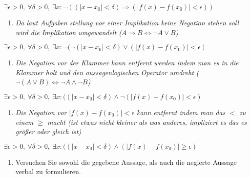 \begin{center}
$\exists \epsilon > 0, \ \forall \delta > 0, \ \exists x : \lnot ((| x - x_0 | < \delta) \Rightarrow (| f(x) - f(x_0)| < \epsilon))$
\end{center}

\begin{enumerate}[label={3.}, leftmargin=*]
\item \textit{Da laut Aufgaben stellung vor einer Implikation keine Negation stehen soll wird die Implikation umgewandelt ($A \Rightarrow B \Leftrightarrow \lnot A \lor B$)}
\end{enumerate}

\begin{center}
$\exists \epsilon > 0, \ \forall \delta > 0, \ \exists x : \lnot (\lnot (|x - x_0| < \delta) \lor (|f(x) - f(x_0)| < \epsilon)$
\end{center}

\begin{enumerate}[label={4.}, leftmargin=*]
\item \textit{Die Negation vor der Klammer kann entfernt werden indem man es in die Klammer holt und den aussagenlogischen Operator umdreht ($\lnot(A \lor B) \Leftrightarrow \lnot A \land \lnot B$)}
\end{enumerate}

\begin{center}
$\exists \epsilon > 0, \ \forall \delta > 0, \ \exists x : ((|x - x_0| < \delta) \land \lnot (|f(x) - f(x_0)| < \epsilon)$
\end{center}

\begin{enumerate}[label={4.}, leftmargin=*]
\item \textit{Die Negation vor $|f(x) - f(x_0)| < \epsilon$ kann entfernt indem man das $<$ zu einem $\geq$ macht (ist etwas nicht kleiner als was anderes, impliziert es das es größer oder gleich ist)}
\end{enumerate}

\begin{center}
$\exists \epsilon > 0, \ \forall \delta > 0, \ \exists x : ((|x - x_0| < \delta) \land (|f(x) - f(x_0)| \geq \epsilon)$
\end{center}

\begin{enumerate}[label={c)}, leftmargin=*]
\item Versuchen Sie sowohl die gegebene Aussage, als auch die negierte Aussage verbal zu formulieren.
\end{enumerate}